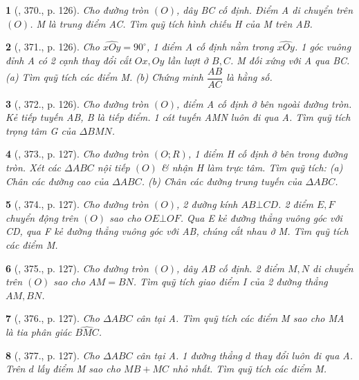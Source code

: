 \documentclass{article}
\newtheorem{baitoan}{}
\begin{document}
\begin{baitoan}[\cite{Binh_Toan_9_tap_2}, 370., p. 126]
	Cho đường tròn $(O)$, dây BC cố định. Điểm A di chuyển trên $(O)$. M là trung điểm AC. Tìm quỹ tích hình chiếu H của M trên AB.
\end{baitoan}

\begin{baitoan}[\cite{Binh_Toan_9_tap_2}, 371., p. 126]
	Cho $\widehat{xOy} = 90^\circ$, 1 điểm A cố định nằm trong $\widehat{xOy}$. 1 góc vuông đỉnh A có 2 cạnh thay đổi cắt $Ox,Oy$ lần lượt ở $B,C$. M đối xứng với A qua BC. (a) Tìm quỹ tích các điểm M. (b) Chứng minh $\dfrac{AB}{AC}$ là hằng số.
\end{baitoan}

\begin{baitoan}[\cite{Binh_Toan_9_tap_2}, 372., p. 126]
	Cho đường tròn $(O)$, điểm A cố định ở bên ngoài đường tròn. Kẻ tiếp tuyến AB, B là tiếp điểm. 1 cát tuyến AMN luôn đi qua A. Tìm quỹ tích trọng tâm G của $\Delta BMN$.
\end{baitoan}

\begin{baitoan}[\cite{Binh_Toan_9_tap_2}, 373., p. 127]
	Cho đường tròn $(O;R)$, 1 điểm H cố định ở bên trong đường tròn. Xét các $\Delta ABC$ nội tiếp $(O)$ \& nhận H làm trực tâm. Tìm quỹ tích: (a) Chân các đường cao của $\Delta ABC$. (b) Chân các đường trung tuyến của $\Delta ABC$.
\end{baitoan}

\begin{baitoan}[\cite{Binh_Toan_9_tap_2}, 374., p. 127]
	Cho đường tròn $(O)$, 2 đường kính $AB\bot CD$. 2 điểm $E,F$ chuyển động trên $(O)$ sao cho $OE\bot OF$. Qua E kẻ đường thẳng vuông góc với CD, qua F kẻ đường thẳng vuông góc với AB, chúng cắt nhau ở M. Tìm quỹ tích các điểm M.
\end{baitoan}

\begin{baitoan}[\cite{Binh_Toan_9_tap_2}, 375., p. 127]
	Cho đường tròn $(O)$, dây AB cố định. 2 điểm $M,N$ di chuyển trên $(O)$ sao cho $AM = BN$. Tìm quỹ tích giao điểm I của 2 đường thẳng $AM,BN$.
\end{baitoan}

\begin{baitoan}[\cite{Binh_Toan_9_tap_2}, 376., p. 127]
	Cho $\Delta ABC$ cân tại A. Tìm quỹ tích các điểm M sao cho MA là tia phân giác $\widehat{BMC}$.
\end{baitoan}

\begin{baitoan}[\cite{Binh_Toan_9_tap_2}, 377., p. 127]
	Cho $\Delta ABC$ cân tại A. 1 đường thẳng $d$ thay đổi luôn đi qua A. Trên $d$ lấy điểm M sao cho $MB + MC$ nhỏ nhất. Tìm quỹ tích các điểm M.
\end{baitoan}
\end{document}
